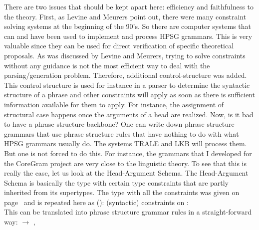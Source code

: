 There are two issues that should be kept apart here: efficiency and faithfulness to the
theory. First, as Levine and Meurers point out, there were many constraint solving systems at the
beginning of the 90's. So there are computer systems that can and have been used to implement
and process HPSG grammars. This is very valuable since they can be used for direct verification of
specific theoretical proposals. As was discussed by Levine and Meurers, trying to solve constraints
without any guidance is not the most efficient way to deal with the parsing/generation
problem. Therefore, additional control-structure was added. This control structure is used for
instance in a parser to determine the syntactic structure of a phrase and other constraints will
apply as soon as there is sufficient information available for them to apply. For instance, the
assignment of structural case happens once the arguments of a head are realized. Now, is it bad to
have a phrase structure backbone? One can write down phrase structure grammars that use phrase
structure rules that have nothing to do with what HPSG grammars usually do. The systems TRALE \citep*{MPR2002a-u,Penn2004a-u} and
LKB will process them. But one is not forced to do this. For instance, the grammars that I developed
for the CoreGram project \citep{MuellerCoreGramBrief,MuellerCoreGram} are very close to the linguistic theory. To see that this is really the
case, let us look at the Head-Argument Schema. The Head-Argument Schema is basically the type
 with certain type constraints that are partly inherited from its
supertypes. The type with all the constraints was given on page~\pageref{head-arg-schema-hfp} and is
repeated here as ():
\largerpage[2]
\eas
\label{head-arg-schema-hfp-zwei}
(syntactic) constraints on :\\
\zs
This can be translated into phrase structure grammar rules in a straight-forward way:
\eal
\ex {} $\to$ , 
